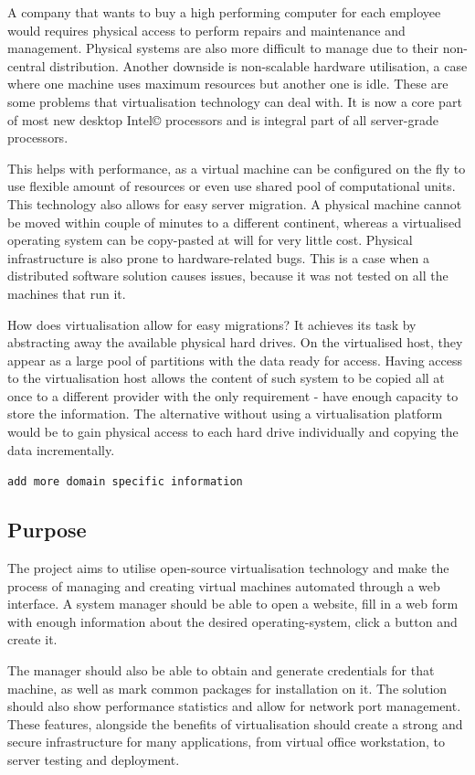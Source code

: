 \documentclass{article}
\begin{document}
A company that wants to buy a high performing computer for each employee would requires physical access to perform repairs and maintenance and management. Physical systems are also more difficult to manage due to their non-central distribution. Another downside is non-scalable hardware utilisation, a case where one machine uses maximum resources but another one is idle. These are some problems that virtualisation technology can deal with.  It is now a core part of most new desktop Intel© processors and is integral part of all server-grade processors.

This helps with performance, as a virtual machine can be configured on the fly to use flexible amount of resources or even use shared pool of computational units. This technology also allows for easy server migration. A physical machine cannot be moved within couple of minutes to a different continent, whereas a virtualised operating system can be copy-pasted at will for very little cost. Physical infrastructure is also prone to hardware-related bugs. This is a case when a distributed software solution causes issues, because it was not tested on all the machines that run it.

How does virtualisation allow for easy \glspl{migration}? It achieves its task by abstracting away the available physical hard drives. On the virtualised host, they appear as a large pool of \glspl{partition} with the data ready for access. Having access to the virtualisation host allows the content of such system to be copied all at once to a different provider with the only requirement - have enough capacity to store the information. The alternative without using a virtualisation platform would be to gain physical access to each hard drive individually and copying the data incrementally.

\texttt{add more domain specific information}

\subsection{Purpose}
The project aims to utilise open-source virtualisation technology and make the process of managing and creating virtual machines automated through a web interface. A system manager should be able to open a website, fill in a web form with enough information about the desired \gls{operating-system}, click a button and create it.

The manager should also be able to obtain and generate credentials for that machine, as well as mark common packages for installation on it. The solution should also show performance statistics and allow for network port management. These features, alongside the benefits of virtualisation should create a strong and secure infrastructure for many applications, from virtual office workstation, to server testing and deployment.
\end{document}
